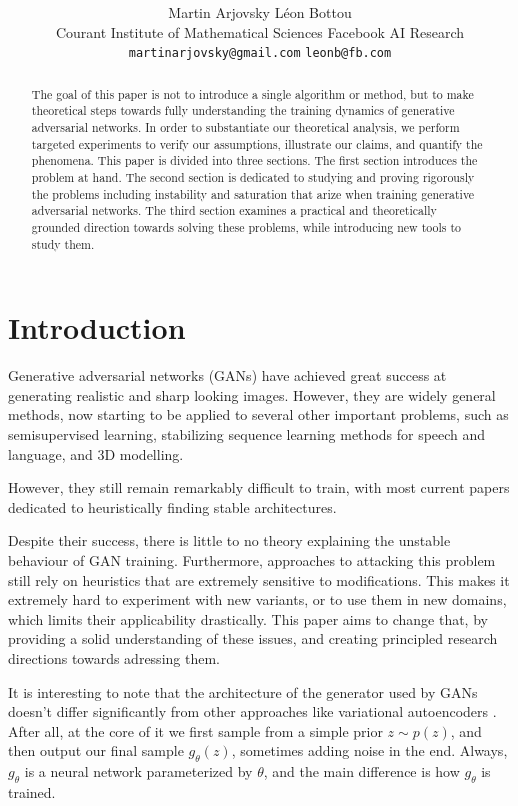 \documentclass{article} %
\title{\centering \scalebox{1}{Towards Principled Methods for Training}\\
       \scalebox{1}{Generative Adversarial Networks}}
\author{
\hspace{21mm} Martin Arjovsky  \hspace{40mm} L\'eon Bottou \\
\hspace{4mm} Courant Institute of Mathematical Sciences \hspace{16mm} Facebook AI Research\\
\hspace{9.75mm} \texttt{martinarjovsky@gmail.com} \hspace{23.5mm} \texttt{leonb@fb.com}
}
\theoremstyle{definition}
\begin{document}
\maketitle

\begin{abstract}
The goal of this paper is not to introduce a single algorithm 
or method, but to make theoretical steps towards fully 
understanding the training dynamics of generative adversarial networks.
In order to substantiate our theoretical analysis, we perform targeted
experiments to verify our assumptions, illustrate our claims,
and quantify the phenomena. This paper is divided into three sections.
The first section introduces the problem at hand. The second section
is dedicated to studying and proving rigorously the problems including
instability and saturation that arize when training generative adversarial 
networks. The third section examines a practical and theoretically grounded 
direction towards solving these problems, while introducing new tools to study them. 
\end{abstract}

\section{Introduction}
Generative adversarial networks (GANs)\citep{Good-ea-GAN} have achieved great
success at generating realistic and sharp looking images.
However, they are widely general methods, now starting to be applied to several
other important problems, such as semisupervised learning, stabilizing sequence
learning methods for speech and language, and 3D modelling. \citep{Denton-ea-LAPGAN,
Rad-ea-DCGAN, Sal-ea-IGAN, Lamb-ea-PF, Wu-ea-3D}

However, they still remain remarkably difficult
to train, with most current papers dedicated to heuristically finding
stable architectures. \citep{Rad-ea-DCGAN, Sal-ea-IGAN}

Despite their success, there is little to no theory explaining the
unstable behaviour of GAN training. Furthermore, approaches to attacking
this problem still rely on heuristics that are extremely sensitive
to modifications. This makes it extremely hard to experiment with
new variants, or to use them in new domains, which limits their
applicability drastically. This paper aims to change that,
by providing a solid understanding of these issues, and creating 
principled research directions towards adressing them.

It is interesting to note that the architecture of the generator
used by GANs doesn't differ significantly from other approaches
like variational autoencoders \citep{Kingma-ea-VAE}. After all, at the core
of it we first sample from a simple prior $z \sim
p(z)$, and then output our final sample $g_\theta(z)$, sometimes
adding noise in the end. Always, $g_\theta$ is a neural network
parameterized by $\theta$, and the main difference is how $g_\theta$ is trained.
\end{document}
